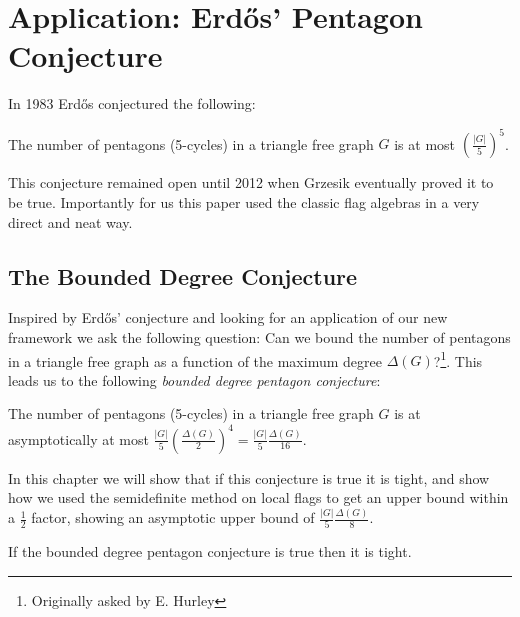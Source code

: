 \chapter{Application: Erd\H{o}s' Pentagon Conjecture}

In 1983 \cite{erdosProblemsGraphTheory1984} Erd\H{o}s conjectured the following:

\begin{knownconjecture}
    The number of pentagons (5-cycles) in a triangle free graph $G$ is at most
    $\left(\frac{|G|}{5}\right)^5$.
\end{knownconjecture}

This conjecture remained open until 2012 when Grzesik
\cite{grzesikMaximumNumberFivecycles2012} eventually proved it to be true. Importantly
for us this paper used the classic flag algebras in a very direct and neat way.

\section{The Bounded Degree Conjecture}

Inspired by Erd\H{o}s' conjecture and looking for an application of our new framework we ask
the following question: Can we bound the number of pentagons in a triangle free graph
as a function of the maximum degree $\Delta(G)$?\footnote{Originally asked by E. Hurley}.
This leads us to the following \textit{bounded degree pentagon conjecture}:

\begin{conjecture}
    \label{conj:bounded_pentagon}
    The number of pentagons (5-cycles) in a triangle free graph $G$ is at asymptotically
    at most $\frac{|G|}{5}\left(\frac{\Delta(G)}{2}\right)^4=\frac{|G|}{5}\frac{\Delta(G)}{16}$.
\end{conjecture}

In this chapter we will show that if this conjecture is true it is tight, and show how we
used the semidefinite method on local flags to get an upper bound within a $\frac{1}{2}$
factor, showing an asymptotic upper bound of $\frac{|G|}{5}\frac{\Delta(G)}{8}$.

\begin{lemma}
    If the bounded degree pentagon conjecture is true then it is tight.
\end{lemma}

